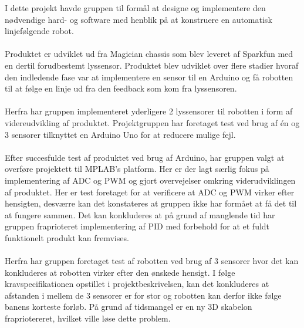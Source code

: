 I dette projekt havde gruppen til formål at designe og implementere den nødvendige hard- og software med henblik på at konstruere en automatisk linjefølgende robot.
\\
\\
Produktet er udviklet ud fra Magician chassis som blev leveret af Sparkfun med en dertil forudbestemt lyssensor. Produktet blev udviklet over flere stadier hvoraf den indledende fase var at implementere en sensor til en Arduino og få robotten til at følge en linje ud fra den feedback som kom fra lyssensoren. 
\\
\\
Herfra har gruppen implementeret yderligere 2 lyssensorer til robotten i form af videreudvikling af produktet. Projektgruppen har foretaget test ved brug af én og 3 sensorer tilknyttet en Arduino Uno for at reducere mulige fejl. 
\\
\\
Efter succesfulde test af produktet ved brug af Arduino, har gruppen valgt at overføre projektett til MPLAB's platform. Her er der lagt særlig fokus på implementering af ADC og PWM og gjort overvejelser omkring viderudviklingen af produktet. Her er test foretaget for at verificere at ADC og PWM virker efter hensigten, desværre kan det konstateres at gruppen ikke har formået at få det til at fungere sammen. Det kan konkluderes at på grund af manglende tid har gruppen fraprioteret implementering af PID med forbehold for at et fuldt funktionelt produkt kan fremvises. 
\\
\\
Herfra har gruppen foretaget test af robotten ved brug af 3 sensorer hvor det kan konkluderes at robotten virker efter den ønskede hensigt. I følge kravspecifikationen opstillet i projektbeskrivelsen, kan det konkluderes at afstanden i mellem de 3 sensorer er for stor og robotten kan derfor ikke følge banens korteste forløb. På grund af tidsmangel er en ny 3D skabelon frapriotereret, hvilket ville løse dette problem.    

